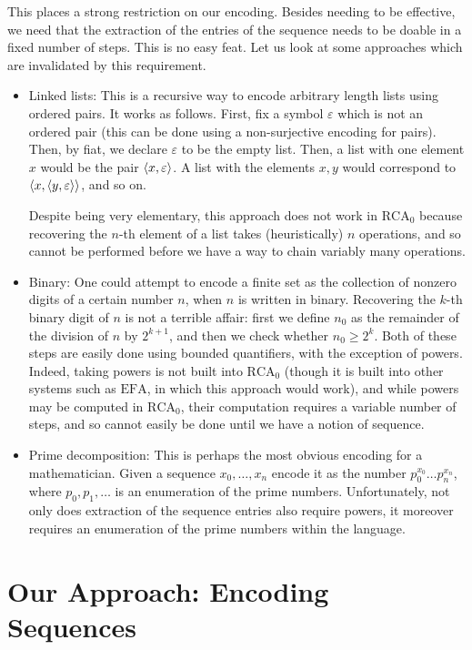\documentclass{article}
\theoremstyle{nonumberplain}
\newcommand{\RCA}{\mathrm{RCA}}
\DeclarePairedDelimiter{\braket}{\langle}{\rangle}
\begin{document}
This places a strong restriction on our encoding. Besides needing to be effective, we need that the extraction of the entries of the sequence needs to be doable in a fixed number of steps. This is no easy feat. Let us look at some approaches which are invalidated by this requirement.
\begin{itemize}
\item Linked lists: This is a recursive way to encode arbitrary length lists using ordered pairs. It works as follows. First, fix a symbol $\varepsilon$ which is not an ordered pair (this can be done using a non-surjective encoding for pairs). Then, by fiat, we declare $\varepsilon$ to be the empty list. Then, a list with one element $x$ would be the pair $\braket{x,\varepsilon}$. A list with the elements $x, y$ would correspond to $\braket{x,\braket{y,\varepsilon}}$, and so on.

Despite being very elementary, this approach does not work in $\RCA_0$ because recovering the $n$-th element of a list takes (heuristically) $n$ operations, and so cannot be performed before we have a way to chain variably many operations.

\item Binary: One could attempt to encode a finite set as the collection of nonzero digits of a certain number $n$, when $n$ is written in binary. Recovering the $k$-th binary digit of $n$ is not a terrible affair: first we define $n_0$ as the remainder of the division of $n$ by $2^{k+1}$, and then we check whether $n_0 \geq 2^k$. Both of these steps are easily done using bounded quantifiers, with the exception of powers. Indeed, taking powers is not built into $\RCA_0$ (though it is built into other systems such as $\mathrm{EFA}$, in which this approach would work), and while powers may be computed in $\RCA_0$, their computation requires a variable number of steps, and so cannot easily be done until we have a notion of sequence.

\item Prime decomposition: This is perhaps the most obvious encoding for a mathematician. Given a sequence $x_0, \dots, x_n$ encode it as the number $p_0^{x_0} \dots p_n^{x_n}$, where $p_0, p_1, \dots$ is an enumeration of the prime numbers. Unfortunately, not only does extraction of the sequence entries also require powers, it moreover requires an enumeration of the prime numbers within the language.
\end{itemize}

\section{Our Approach: Encoding Sequences}
\end{document}

